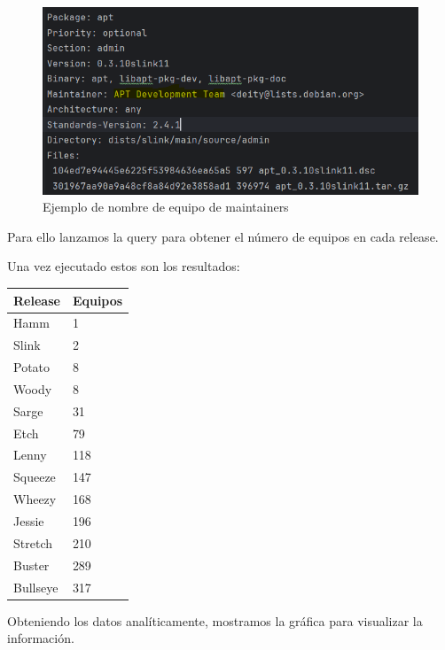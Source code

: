 \documentclass[a4paper, 12pt]{book}
\begin{document}
\begin{figure}
	\centering
	\includegraphics[width=15cm, keepaspectratio]{img/Ejemplo equipo 2.png}
	\caption{Ejemplo de nombre de equipo de maintainers}
	\label{fig:ejemplo_equipo_2}
\end{figure}

Para ello lanzamos la query para obtener el número de equipos en cada release.

Una vez ejecutado estos son los resultados:

\begin{table}[]
	\begin{center}
		\begin{tabular}{|l|l|}
			\hline
			Release  & Equipos \\ \hline
			Hamm     & 1       \\ \hline
			Slink    & 2       \\ \hline
			Potato   & 8       \\ \hline
			Woody    & 8       \\ \hline
			Sarge    & 31      \\ \hline
			Etch     & 79      \\ \hline
			Lenny    & 118     \\ \hline
			Squeeze  & 147     \\ \hline
			Wheezy   & 168     \\ \hline
			Jessie   & 196     \\ \hline
			Stretch  & 210     \\ \hline
			Buster   & 289     \\ \hline
			Bullseye & 317     \\ \hline
		\end{tabular}
	\end{center}
\end{table}

Obteniendo los datos analíticamente, mostramos la gráfica para visualizar la información.
\end{document}
